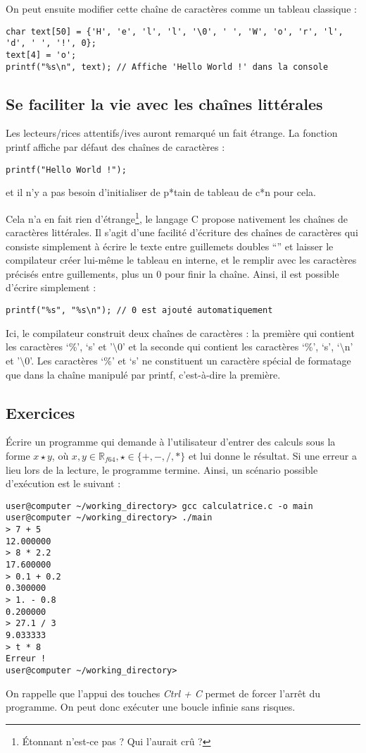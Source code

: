 \documentclass[../../../main.tex]{subfiles}
\begin{document}
On peut ensuite modifier cette chaîne de caractères comme un tableau classique :
\begin{verbatim}
char text[50] = {'H', 'e', 'l', 'l', '\0', ' ', 'W', 'o', 'r', 'l', 'd', ' ', '!', 0};
text[4] = 'o';
printf("%s\n", text); // Affiche 'Hello World !' dans la console
\end{verbatim}
\subsection{Se faciliter la vie avec les chaînes littérales}\label{sub:se_faciliter_la_vie_avec_les_cha_nes_litt_rales}
Les lecteurs/rices attentifs/ives auront remarqué un fait étrange. La fonction \textsf{printf} affiche par défaut des chaînes de caractères :
\begin{verbatim}
printf("Hello World !");
\end{verbatim}
et il n'y a pas besoin d'initialiser de p*tain de tableau de c*n pour cela.
 
Cela n'a en fait rien d'étrange\footnote{Étonnant n'est-ce pas ? Qui l'aurait crû ?}, le langage C propose nativement les chaînes de caractères littérales. Il s'agit d'une facilité d'écriture des chaînes de caractères qui consiste simplement à écrire le texte entre guillemets doubles ``'' et laisser le compilateur créer lui-même le tableau en interne, et le remplir avec les caractères précisés entre guillements, plus un 0 pour finir la chaîne.\newline
Ainsi, il est possible d'écrire simplement :
\begin{verbatim}
printf("%s", "%s\n"); // 0 est ajouté automatiquement
\end{verbatim}
Ici, le compilateur construit deux chaînes de caractères : la première qui contient les caractères `\%', `s' et '$\setminus{0}$' et la seconde qui contient les caractères `\%', `s', `$\setminus$n' et '$\setminus0$'. Les caractères `\%' et `s' ne constituent un caractère spécial de formatage que dans la chaîne manipulé par \textsf{printf}, c'est-à-dire la première.
\subsection{Exercices}
Écrire un programme qui demande à l'utilisateur d'entrer des calculs sous la forme $x\star y$, où $x, y\in{\mathbb{R}_{f64}}, \star\in\{+, -, /, *\}$ et lui donne le résultat. Si une erreur a lieu lors de la lecture, le programme termine. Ainsi, un scénario possible d'exécution est le suivant :
\begin{verbatim}
user@computer ~/working_directory> gcc calculatrice.c -o main
user@computer ~/working_directory> ./main
> 7 + 5
12.000000
> 8 * 2.2
17.600000
> 0.1 + 0.2
0.300000
> 1. - 0.8
0.200000
> 27.1 / 3
9.033333
> t * 8
Erreur !
user@computer ~/working_directory>
\end{verbatim}
On rappelle que l'appui des touches \textit{Ctrl + C} permet de forcer l'arrêt du programme. On peut donc exécuter une boucle infinie sans risques.
 
\end{document}
